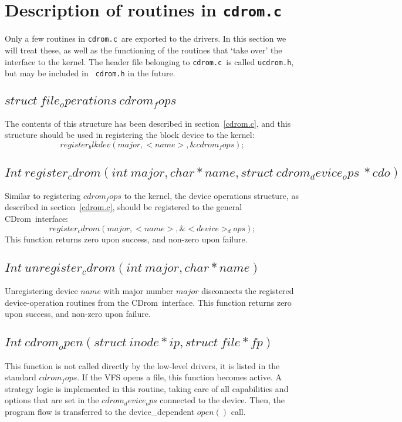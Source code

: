 \documentclass{article}
\def\cdrom{{\sc CDrom}}
\def\cdromc{{\tt cdrom.c}}
\def\ucdrom{{\tt ucdrom.h}}
\begin{document}
\section{Description of routines in \cdromc}

Only a few routines in \cdromc\ are exported to the drivers. In this
section we will treat these, as well as the functioning of the routines
that `take over' the interface to the kernel. The header file
belonging to \cdromc\ is called \ucdrom, but may be included in {\tt
cdrom.h} in the future.

\subsection{$struct\ file_operations\ cdrom_fops$}

The contents of this structure has been described in
section~\ref{cdrom.c}, and this structure should be used in
registering the block device to the kernel:
$$
register_blkdev(major, <name>, \&cdrom_fops);
$$

\subsection{$Int\ register_cdrom(int\ major, char * name, struct\
cdrom_device_ops\ * cdo)$}

Similar to registering $cdrom_fops$ to the kernel, the device
operations structure, as described in section~\ref{cdrom.c}, should be
registered to the general \cdrom\ interface:
$$
register_cdrom(major, <name>, \&<device>_dops);
$$
This function returns zero upon success, and non-zero upon failure. 

\subsection{$Int\ unregister_cdrom(int\ major, char * name)$}

Unregistering device $name$ with major number $major$ disconnects the
registered device-operation routines from the \cdrom\ interface.
This function returns zero upon success, and non-zero upon failure. 

\subsection{$Int\ cdrom_open(struct\ inode * ip, struct\ file * fp)$}

This function is not called directly by the low-level drivers, it is
listed in the standard $cdrom_fops$. If the VFS opens a file, this
function becomes active. A strategy logic is implemented in this
routine, taking care of all capabilities and options that are set in
the $cdrom_device_ops$ connected to the device. Then, the program flow is
transferred to the device_dependent $open()$ call. 
\end{document}
